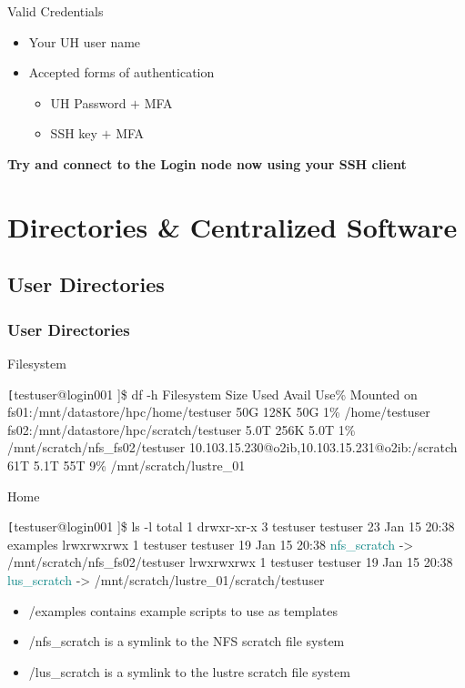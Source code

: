 \begin{frame}
\begin{block}{Valid Credentials}
		\begin{itemize}
			\item Your UH user name
			\item Accepted forms of authentication
			\begin{itemize}\scriptsize
				\item UH Password $+$ MFA 
				\item SSH key $+$ MFA
			\end{itemize}
		\end{itemize}
	\end{block}
	\begin{center}\scriptsize
	\textbf{\large Try and connect to the {\mana} Login node now using your SSH client}
	\end{center}
\end{frame}

 
\section[Directories \& Centralized Software]{Directories \& Centralized Software }
\subsection{User Directories}
\begin{frame}[fragile]
\frametitle{User Directories}
\begin{block}{Filesystem}
\begin{semiverbatim}\tiny \texttt
[testuser@login001 \ctilde]\$ df -h
Filesystem                                       Size  Used Avail Use\%  Mounted on
fs01:/mnt/datastore/hpc/home/testuser             50G  128K   50G   1\%  /home/testuser
fs02:/mnt/datastore/hpc/scratch/testuser         5.0T  256K  5.0T   1\%  /mnt/scratch/nfs_fs02/testuser
10.103.15.230@o2ib,10.103.15.231@o2ib:/scratch    61T  5.1T  55T   9\%   /mnt/scratch/lustre_01
\end{semiverbatim}
\end{block}
\begin{block}{Home}
\begin{semiverbatim}\tiny \texttt
[testuser@login001 \ctilde]\$ ls -l 
total 1
drwxr-xr-x 3 testuser testuser 23 Jan 15 20:38 examples
lrwxrwxrwx 1 testuser testuser 19 Jan 15 20:38 \textcolor{teal}{nfs_scratch} -> /mnt/scratch/nfs_fs02/testuser
lrwxrwxrwx 1 testuser testuser 19 Jan 15 20:38 \textcolor{teal}{lus_scratch} -> /mnt/scratch/lustre_01/scratch/testuser
\end{semiverbatim}
\end{block}
\begin{itemize}
		\item \ctilde{}/examples contains example scripts to use as templates
		\item \ctilde{}/nfs\_scratch is a symlink to the NFS scratch file system
		\item \ctilde{}/lus\_scratch is a symlink to the lustre scratch file system
\end{itemize}
\end{frame}


